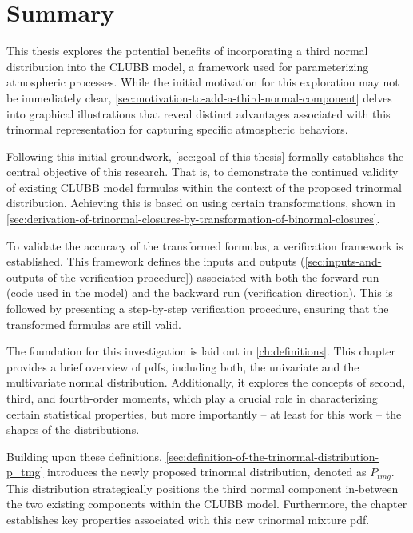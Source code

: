 \chapter{Summary}\label{ch:summary}

This thesis explores the potential benefits of incorporating a third normal distribution into the \gls{CLUBB} model,
a framework used for parameterizing atmospheric processes.
While the initial motivation for this exploration may not be immediately clear,
\cref{sec:motivation-to-add-a-third-normal-component} delves into graphical illustrations
that reveal distinct advantages associated
with this trinormal representation for capturing specific atmospheric behaviors.

Following this initial groundwork,
\cref{sec:goal-of-this-thesis} formally establishes the central objective of this research.
That is, to demonstrate the continued validity of existing \gls{CLUBB} model formulas
within the context of the proposed trinormal distribution.
Achieving this is based on using certain transformations,
shown in \cref{sec:derivation-of-trinormal-closures-by-transformation-of-binormal-closures}.

To validate the accuracy of the transformed formulas,
a verification framework is established.
This framework defines the inputs and outputs (\cref{sec:inputs-and-outputs-of-the-verification-procedure})
associated with both the forward run (code used in the model)
and the backward run (verification direction).
This is followed by presenting a step-by-step verification procedure,
ensuring that the transformed formulas are still valid.

The foundation for this investigation is laid out in \cref{ch:definitions}.
This chapter provides a brief overview of \glspl{pdf},
including both, the univariate and the multivariate normal distribution.
Additionally, it explores the concepts of second, third, and fourth-order moments,
which play a crucial role in characterizing certain statistical properties,
but more importantly
-- at least for this work --
the shapes of the distributions.

Building upon these definitions,
\cref{sec:definition-of-the-trinormal-distribution-p_tmg}
introduces the newly proposed trinormal distribution, denoted as $P_{tmg}$.
This distribution strategically positions the third normal component in-between the two existing components
within the \gls{CLUBB} model.
Furthermore, the chapter establishes key properties associated with this new trinormal mixture \gls{pdf}.


